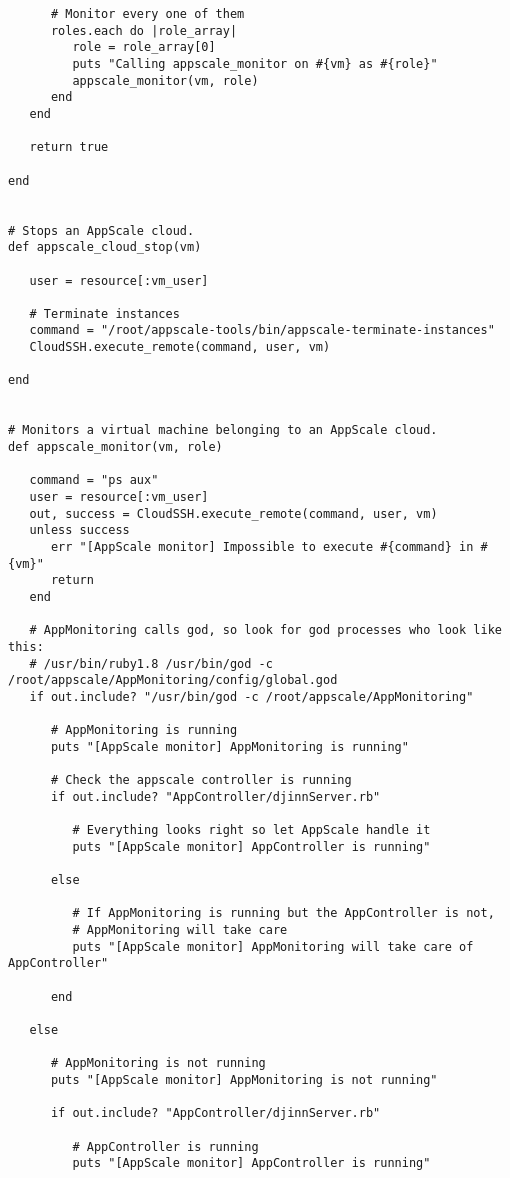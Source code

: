 \begin{lstlisting}
      # Monitor every one of them
      roles.each do |role_array|
         role = role_array[0]
         puts "Calling appscale_monitor on #{vm} as #{role}"
         appscale_monitor(vm, role)
      end
   end

   return true
   
end


# Stops an AppScale cloud.
def appscale_cloud_stop(vm)
   
   user = resource[:vm_user]
   
   # Terminate instances
   command = "/root/appscale-tools/bin/appscale-terminate-instances"
   CloudSSH.execute_remote(command, user, vm)
   
end


# Monitors a virtual machine belonging to an AppScale cloud.
def appscale_monitor(vm, role)

   command = "ps aux"
   user = resource[:vm_user]
   out, success = CloudSSH.execute_remote(command, user, vm)
   unless success
      err "[AppScale monitor] Impossible to execute #{command} in #{vm}"
      return
   end
   
   # AppMonitoring calls god, so look for god processes who look like this:
   # /usr/bin/ruby1.8 /usr/bin/god -c /root/appscale/AppMonitoring/config/global.god
   if out.include? "/usr/bin/god -c /root/appscale/AppMonitoring"
   
      # AppMonitoring is running
      puts "[AppScale monitor] AppMonitoring is running"

      # Check the appscale controller is running
      if out.include? "AppController/djinnServer.rb"
         
         # Everything looks right so let AppScale handle it
         puts "[AppScale monitor] AppController is running"
      
      else
         
         # If AppMonitoring is running but the AppController is not,
         # AppMonitoring will take care
         puts "[AppScale monitor] AppMonitoring will take care of AppController"
         
      end

   else
   
      # AppMonitoring is not running
      puts "[AppScale monitor] AppMonitoring is not running"
   
      if out.include? "AppController/djinnServer.rb"

         # AppController is running
         puts "[AppScale monitor] AppController is running"
         

\end{lstlisting}
